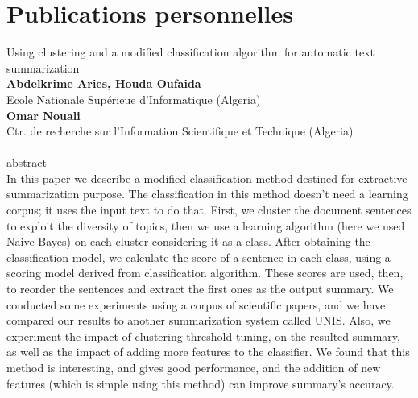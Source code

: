 \documentclass[a4paper,12pt,oneside]{../use/ESIthesis}
\begin{document}

  	 	\mainmatter
  	 	\appendix
  \fi
\chapter{Publications personnelles}
\noindent
{\huge Using clustering and a modified classification algorithm for automatic text summarization}\\[20px]
\textbf{Abdelkrime Aries, Houda Oufaida}\\
Ecole Nationale Supérieue d'Informatique (Algeria)\\[3mm]
%
\textbf{Omar Nouali}\\
Ctr. de recherche sur l'Information Scientifique et Technique (Algeria)\\
%
\\[5mm]
%
{\Large abstract}\\
In this paper we describe a modified classification method destined for extractive summarization purpose. 
The classification in this method doesn’t need a learning corpus; it uses the input text to do that. 
First, we cluster the document sentences to exploit the diversity of topics, then we use a learning algorithm (here we used Naive Bayes) on each cluster considering it as a class. 
After obtaining the classification model, we calculate the score of a sentence in each class, using a scoring model derived from classification algorithm. 
These scores are used, then, to reorder the sentences and extract the first ones as the output summary. 
We conducted some experiments using a corpus of scientific papers, and we have compared our results to another summarization system called UNIS. 
Also, we experiment the impact of clustering threshold tuning, on the resulted summary, as well as the impact of adding more features to the classifier. 
We found that this method is interesting, and gives good performance, and the addition of new features (which is simple using this method) can improve summary’s accuracy.

\ifx\wholebook\relax\else
 \cleardoublepage
 
 
 
\end{document}
